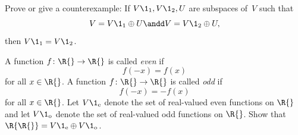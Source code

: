 \exercise
Prove or give a counterexample: If $V\1_1, V\1_2, U$ are subspaces of~$V$ such that
\[
V = V\1_1 \oplus U \andd V = V\1_2 \oplus U,
\]
then $V\1_1 = V\1_2$.


\exercise
A function $f\colon \R{} \to \R{}$ is called \emph{even} if
\[
f(-x) = f(x)
\]
for all $x \in \R{}$. A function $f\colon \R{} \to \R{}$ is called \emph{odd} if
\[
f(-x) = -f(x)
\]
for all $x \in \R{}$. Let $V\1_\text{e}$ denote the set of real-valued even functions on $\R{}$ and let $V\1_\text{o}$ denote the set of real-valued odd functions on $\R{}$.
Show that $\R{\R{}} = V\1_\text{e} \oplus V\1_\text{o}$.



